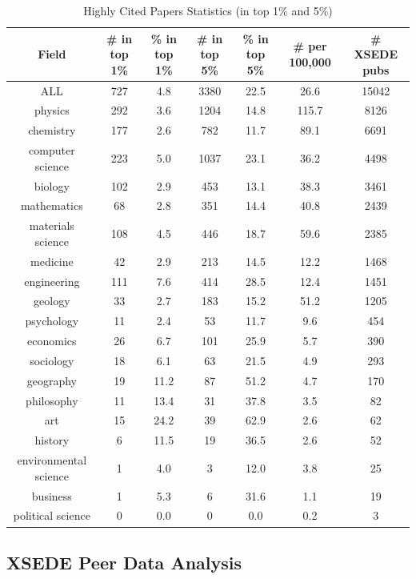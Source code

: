 \documentclass{sig-alternate}
\begin{document}
\begin{table}[t]
\caption{Highly Cited Papers Statistics (in top 1\% and 5\%)}
\label{T:field_highly_cited}
\centering
 \begin{tabular}{||c c c c c c c||}
 \hline
Field &    \# in top 1\% & \% in top 1\% & \# in top 5\% & \% in top 5\% & \# per 100,000 & \# XSEDE pubs \\ [0.5ex]
 \hline\hline
ALL & 727 & 4.8 & 3380 & 22.5 & 26.6 & 15042 \\
\hline
physics & 292 & 3.6 & 1204 & 14.8 & 115.7 & 8126 \\
\hline
chemistry & 177 & 2.6 & 782 & 11.7 & 89.1 & 6691 \\
\hline
computer science & 223 & 5.0 & 1037 & 23.1 & 36.2 & 4498 \\
\hline
biology & 102 & 2.9 & 453 & 13.1 & 38.3 & 3461 \\
\hline
mathematics & 68 & 2.8 & 351 & 14.4 & 40.8 & 2439 \\
\hline
materials science & 108 & 4.5 & 446 & 18.7 & 59.6 & 2385 \\
\hline
medicine & 42 & 2.9 & 213 & 14.5 & 12.2 & 1468 \\
\hline
engineering & 111 & 7.6 & 414 & 28.5 & 12.4 & 1451 \\
\hline
geology & 33 & 2.7 & 183 & 15.2 & 51.2 & 1205 \\
\hline
psychology & 11 & 2.4 & 53 & 11.7 & 9.6 & 454 \\
\hline
economics & 26 & 6.7 & 101 & 25.9 & 5.7 & 390 \\
\hline
sociology & 18 & 6.1 & 63 & 21.5 & 4.9 & 293 \\
\hline
geography & 19 & 11.2 & 87 & 51.2 & 4.7 & 170 \\
\hline
philosophy & 11 & 13.4 & 31 & 37.8 & 3.5 & 82 \\
\hline
art & 15 & 24.2 & 39 & 62.9 & 2.6 & 62 \\
\hline
history & 6 & 11.5 & 19 & 36.5 & 2.6 & 52 \\
\hline
environmental science & 1 & 4.0 & 3 & 12.0 & 3.8 & 25 \\
\hline
business & 1 & 5.3 & 6 & 31.6 & 1.1 & 19 \\
\hline
political science & 0 & 0.0 & 0 & 0.0 & 0.2 & 3 \\ [1ex]
 \hline
\end{tabular}
\end{table}

\subsection{XSEDE Peer Data Analysis} \label{S:xsede}
\end{document}
